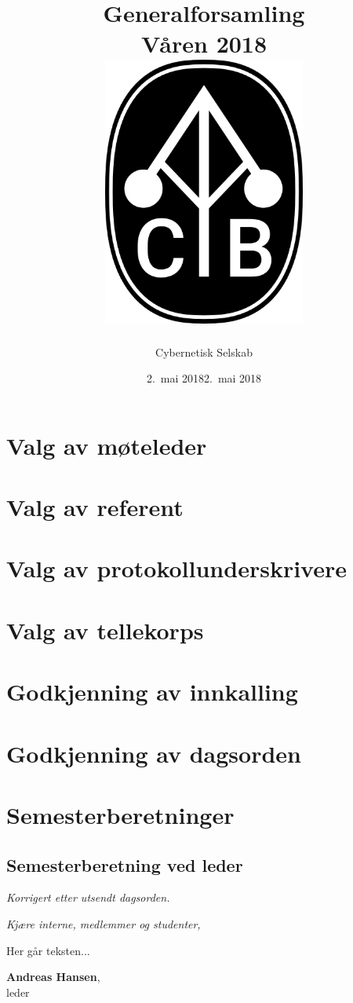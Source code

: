 \documentclass[10pt,norsk,a4paper]{article}
\title{Generalforsamling \\
	Våren 2018\\[3cm]
	\includegraphics[width=0.5\textwidth]{cyblogo.png}\\[-.5cm]}
\date{2.\ mai 2018}
\author{Cybernetisk Selskab}
\begin{document}
\maketitle{}
\newpage
\tableofcontents{}


\section{Valg av møteleder}

\section{Valg av referent}

\section{Valg av protokollunderskrivere}

\section{Valg av tellekorps}

\section{Godkjenning av innkalling}

\section{Godkjenning av dagsorden}

\section{Semesterberetninger}
\subsection{Semesterberetning ved leder}
\textit{\small Korrigert etter utsendt dagsorden.}

\textit{Kjære interne, medlemmer og studenter,}
\begin{multicols}{2}

	Her går teksten...

\end{multicols}

\textbf{Andreas Hansen},\\
leder \\
\date{2.\ mai 2018}
\newpage
\end{document}

